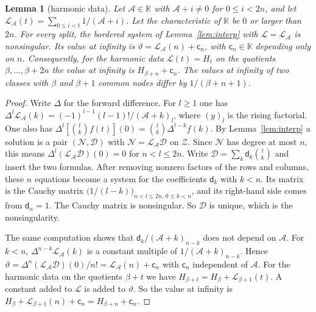 \documentclass[11pt]{amsart}
\newtheorem{lemma}[theorem]{Lemma}
\theoremstyle{definition}
\theoremstyle{remark}
\numberwithin{equation}{section}
\begin{document}
\begin{lemma}[harmonic data]\label{lem:harmonic}
Let $\mathcal A\in\mathbb K$ with $\mathcal A+i\ne0$ for $0\le i<2n$, and let
$\mathcal L_{\mathcal A}(t)=\sum_{0\le i<t}1/(\mathcal A+i)$. Let the characteristic of $\mathbb K$ be $0$ or larger than
$2n$. For every split, the bordered system of Lemma~\ref{lem:interp} with $\mathcal L=\mathcal L_{\mathcal A}$ is
nonsingular. Its value at infinity is $\vartheta=\mathcal L_{\mathcal A}(n)+\mathsf c_n$, with $\mathsf c_n\in\mathbb K$
depending only on $n$. Consequently, for the harmonic data $\mathcal L(t)=H_t$ on the quotients $\beta,\dots,\beta+2n$ the
value at infinity is $H_{\beta+n}+\mathsf c_n$. The values at infinity of two classes with $\beta$ and $\beta+1$ common nodes differ by
$1/(\beta+n+1)$.
\end{lemma}
\begin{proof}
Write $\Delta$ for the forward difference. For $l\ge1$ one has
$\Delta^l\mathcal L_{\mathcal A}(k)=(-1)^{l-1}(l-1)!/(\mathcal A+k)_l$, where $(y)_l$ is the rising factorial. One also
has $\Delta^l[\binom tk f(t)](0)=\binom lk\Delta^{l-k}f(k)$. By Lemma~\ref{lem:interp} a solution is a pair
$(\mathcal N,\mathcal D)$ with $\mathcal N=\mathcal L_{\mathcal A}\mathcal D$ on $\mathcal Z$. Since $\mathcal N$ has degree
at most $n$, this means $\Delta^l(\mathcal L_{\mathcal A}\mathcal D)(0)=0$ for $n<l\le2n$. Write
$\mathcal D=\sum_k\mathsf d_k\binom tk$ and insert the two formulas. After removing nonzero factors of the rows and
columns, these $n$ equations become a system for the coefficients $\mathsf d_k$ with $k<n$. Its matrix is the Cauchy
matrix $\bigl(1/(l-k)\bigr)_{n<l\le2n,\,0\le k<n}$, and its right-hand side comes from $\mathsf d_n=1$. The Cauchy matrix
is nonsingular. So $\mathcal D$ is unique, which is the nonsingularity.

The same computation shows that $\mathsf d_k/(\mathcal A+k)_{n-k}$ does not depend on $\mathcal A$. For $k<n$,
$\Delta^{n-k}\mathcal L_{\mathcal A}(k)$ is a constant multiple of $1/(\mathcal A+k)_{n-k}$. Hence
$\vartheta=\Delta^n(\mathcal L_{\mathcal A}\mathcal D)(0)/n!=\mathcal L_{\mathcal A}(n)+\mathsf c_n$ with
$\mathsf c_n$ independent of $\mathcal A$. For the harmonic data on the quotients $\beta+t$ we have
$H_{\beta+t}=H_\beta+\mathcal L_{\beta+1}(t)$. A constant added to $\mathcal L$ is added to $\vartheta$. So the value at infinity is
$H_\beta+\mathcal L_{\beta+1}(n)+\mathsf c_n=H_{\beta+n}+\mathsf c_n$.
\end{proof}
\end{document}
